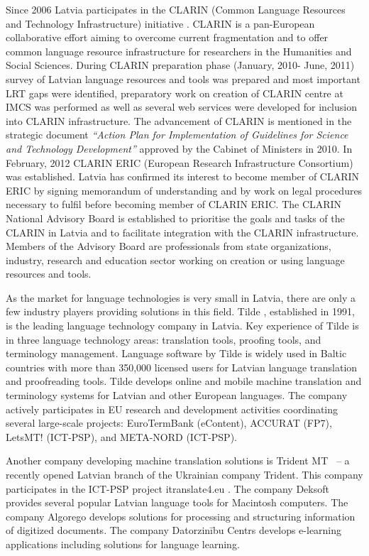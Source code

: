\begin{multicols}{2}
Since 2006 Latvia participates in the CLARIN (Common Language Resources and Technology Infrastructure) initiative \cite{metaClarin}.
CLARIN is a pan-European collaborative effort aiming to overcome current fragmentation and to offer common language resource infrastructure for researchers in the Humanities and Social Sciences.
During CLARIN preparation phase (January, 2010- June, 2011) survey of Latvian language resources and tools was prepared and most important LRT gaps were identified, preparatory work on creation of CLARIN centre at IMCS was performed as well as several web services were developed for inclusion into CLARIN infrastructure.
The advancement of CLARIN is mentioned in the strategic document \textit{“Action Plan for Implementation of Guidelines for Science and Technology Development”} approved by the Cabinet of Ministers in 2010.  In February, 2012 CLARIN ERIC (European Research Infrastructure Consortium) was established.
Latvia has confirmed its interest to become member of CLARIN ERIC by signing memorandum of understanding and by work on legal procedures necessary to fulfil before becoming member of CLARIN ERIC. The CLARIN National Advisory Board is established to prioritise the goals and tasks of the CLARIN in Latvia and to facilitate integration with the CLARIN infrastructure.
Members of the Advisory Board are professionals from state organizations, industry, research and education sector working on creation or using language resources and tools.

As the market for language technologies is very small in Latvia, there are only a few industry players providing solutions in this field.
Tilde \cite{Meta41}, established in 1991, is the leading language technology company in Latvia.
Key experience of Tilde is in three language technology areas: translation tools, proofing tools, and terminology management.
Language software by Tilde is widely used in Baltic countries with more than 350,000 licensed users for Latvian language translation and proofreading tools.
Tilde develops online and mobile machine translation and terminology systems for Latvian and other European languages.
The company actively participates in EU research and development activities coordinating several large-scale projects: EuroTermBank (eContent), ACCURAT (FP7), LetsMT! (ICT-PSP), and META-NORD (ICT-PSP). 

Another company developing machine translation solutions is Trident MT \cite{Meta42}~-- a recently opened Latvian branch of the Ukrainian company Trident.
This company participates in the ICT-PSP project itranslate4.eu \cite{Meta43}.
The company Deksoft \cite{MetaRef1} provides several popular Latvian language tools for Macintosh computers. 
The company Algorego \cite{Meta44} develops solutions for processing and structuring information of digitized documents.
The company Datorzinību Centrs \cite{Meta45} develops e-learning applications including solutions for language learning.


\end{multicols}
